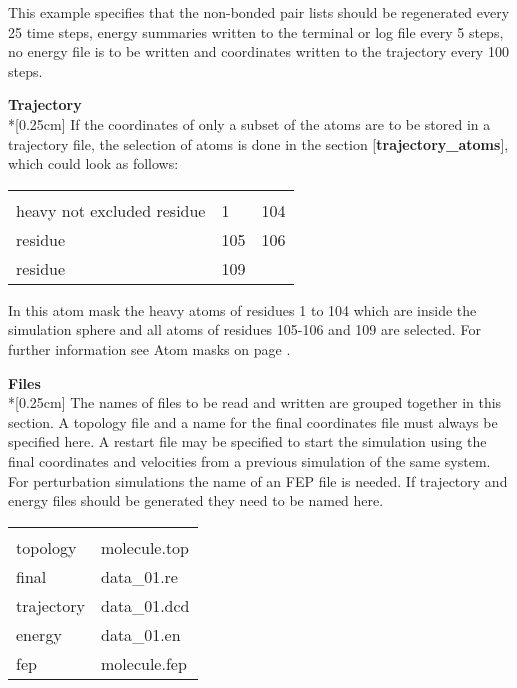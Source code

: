 \documentclass[a4paper,10pt]{article}
\begin{document}
This example specifies that the non-bonded pair lists should be
regenerated every 25 time steps, energy summaries written to the
terminal or log file every 5 steps, no energy file is to be
written and coordinates written to the trajectory every 100 steps.

\bigskip
\textbf{Trajectory}\\*[0.25cm] If the coordinates of only a subset
of the atoms are to be stored in a trajectory file, the selection
of atoms is done in the section [\textbf{trajectory{\_}atoms}],
which could look as follows:

\begin{center}
\begin{tabularx}{\textwidth}{|l l X|}
  \hline
  [trajectory{\_}atoms]      & & \\
  heavy not excluded residue & 1 & 104 \\
  residue                    & 105 & 106 \\
  residue                    & 109 & \\ \hline
\end{tabularx}
\end{center}

In this atom mask the heavy atoms of residues 1 to 104 which are
inside the simulation sphere and all atoms of residues 105-106 and
109 are selected. For further information see Atom masks on page
\pageref{subsubsec:atom_masks}.

\bigskip
\textbf{Files}\\*[0.25cm] The names of files to be read and
written are grouped together in this section. A topology file and
a name for the final coordinates file must always be specified
here. A restart file may be specified to start the simulation
using the final coordinates and velocities from a previous
simulation of the same system. For perturbation simulations the
name of an FEP file is needed. If trajectory and energy files
should be generated they need to be named here.

\begin{center}
\begin{tabularx}{\textwidth}{|l X|}
  \hline
  [files]    & \\
  topology   & molecule.top \\
  final      & data{\_}01.re \\
  trajectory & data{\_}01.dcd \\
  energy     & data{\_}01.en \\
  fep        & molecule.fep \\ \hline
\end{tabularx}
\end{center}
\end{document}
